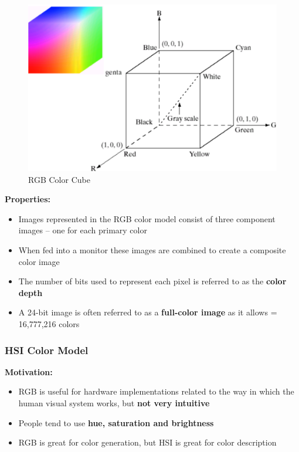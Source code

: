 \begin{minipage}{\linewidth}
  \begin{figure}[H]
    \centering
    \includegraphics[width=\linewidth]{images/rgb_cube.png}
    \caption{RGB Color Cube}
  \end{figure}
\end{minipage}

\textbf{Properties:}

\begin{itemize}

  \item Images represented in the RGB color model consist of three
    component images – one for each primary color
  \item When fed into a monitor these images are combined to create a
    composite color image
  \item The number of bits used to represent each pixel is referred
    to as the \textbf{color depth}
  \item A 24-bit image is often referred to as a \textbf{full-color image} as
    it allows = 16,777,216 colors
\end{itemize}

\subsubsection*{HSI Color Model}

\textbf{Motivation:}

\begin{itemize}
  \item RGB is useful for hardware implementations related to the way
    in which the human visual system works, but \textbf{not very intuitive}
  \item People tend to use \textbf{hue, saturation and brightness}
  \item RGB is great for color generation, but HSI is great for color
    description
\end{itemize}

